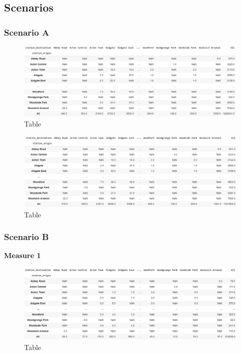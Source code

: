 \documentclass[10pt]{report}
\numberwithin{figure}{section}
\numberwithin{table}{section}
\begin{document}
\newpage    
\subsection{Scenarios}
\subsubsection{Scenario A}

    \begin{figure}[htp]
        \centering
        \includegraphics[width=14cm]{Image/Part2_OD3_scenario A.png}
        \caption{Table}
        \label{fig:galaxy}
    \end{figure}

    \begin{figure}[htp]
        \centering
        \includegraphics[width=14cm]{Image/Part2_OD4_scenario A.png}
        \caption{Table}
        \label{fig:galaxy}
    \end{figure}

\newpage    

\subsubsection{Scenario B}

\textbf{Measure 1}
    \begin{figure}[htp]
        \centering
        \includegraphics[width=14cm]{Image/Part2_OD5_scenario B.png}
        \caption{Table}
        \label{fig:galaxy}
    \end{figure}
\end{document}
